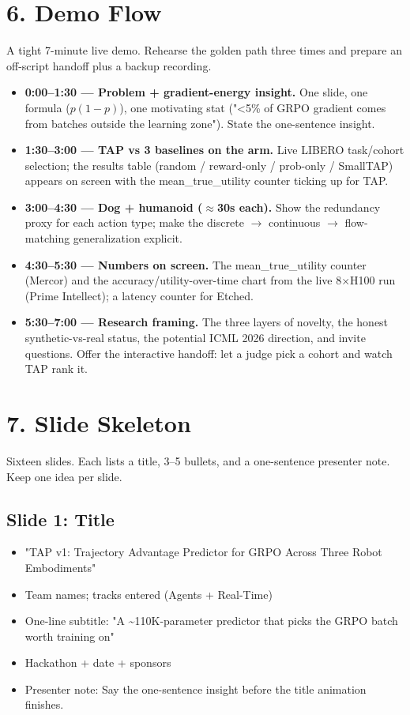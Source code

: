 \documentclass[11pt,letterpaper]{article}
\begin{document}
\medskip

\section*{6. Demo Flow}

A tight 7-minute live demo. Rehearse the golden path three times and prepare an off-script handoff plus a backup recording.

\begin{itemize}
\item \textbf{0:00--1:30 --- Problem + gradient-energy insight.} One slide, one formula ($p(1-p)$), one motivating stat ("<5\% of GRPO gradient comes from batches outside the learning zone"). State the one-sentence insight.
\item \textbf{1:30--3:00 --- TAP vs 3 baselines on the arm.} Live LIBERO task/cohort selection; the results table (random / reward-only / prob-only / SmallTAP) appears on screen with the mean\_true\_utility counter ticking up for TAP.
\item \textbf{3:00--4:30 --- Dog + humanoid ($\approx$30s each).} Show the redundancy proxy for each action type; make the discrete $\rightarrow$ continuous $\rightarrow$ flow-matching generalization explicit.
\item \textbf{4:30--5:30 --- Numbers on screen.} The mean\_true\_utility counter (Mercor) and the accuracy/utility-over-time chart from the live 8$\times$H100 run (Prime Intellect); a latency counter for Etched.
\item \textbf{5:30--7:00 --- Research framing.} The three layers of novelty, the honest synthetic-vs-real status, the potential ICML 2026 direction, and invite questions. Offer the interactive handoff: let a judge pick a cohort and watch TAP rank it.
\end{itemize}

\medskip

\section*{7. Slide Skeleton}

Sixteen slides. Each lists a title, 3--5 bullets, and a one-sentence presenter note. Keep one idea per slide.

\subsection*{Slide 1: Title}

\begin{itemize}
\item "TAP v1: Trajectory Advantage Predictor for GRPO Across Three Robot Embodiments"
\item Team names; tracks entered (Agents + Real-Time)
\item One-line subtitle: "A \textasciitilde{}110K-parameter predictor that picks the GRPO batch worth training on"
\item Hackathon + date + sponsors
\item Presenter note: Say the one-sentence insight before the title animation finishes.
\end{itemize}
\end{document}
